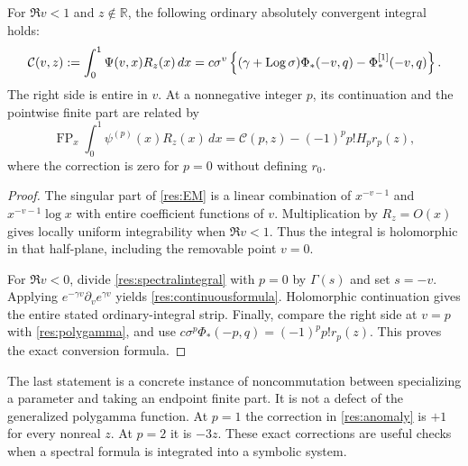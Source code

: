 \begin{theorem}
\label{res:continuous}
For $\Re v<1$ and $z\notin\mathbb R$, the following ordinary
absolutely convergent integral holds:
\begin{equation}\label{res:continuousformula}
 \mathcal C(v,z):=\int_0^1\Psi(v,x)R_z(x)\,dx
   =c\sigma^v\left\{(\gamma+\operatorname{Log}\sigma)\Phi_*(-v,q)
                                         -\Phi_*^{[1]}(-v,q)\right\}.
\end{equation}
The right side is entire in $v$. At a nonnegative integer $p$,
its continuation and the pointwise finite part are related by
\begin{equation}\label{res:anomaly}
 \operatorname{FP}_x\int_0^1\psi^{(p)}(x)R_z(x)\,dx
    =\mathcal C(p,z)-(-1)^pp!H_p r_p(z),
\end{equation}
where the correction is zero for $p=0$ without defining $r_0$.
\end{theorem}

\begin{proof}
The singular part of \eqref{res:EM} is a linear combination of
$x^{-v-1}$ and $x^{-v-1}\log x$ with entire coefficient functions
of $v$. Multiplication by $R_z=O(x)$ gives locally uniform
integrability when $\Re v<1$. Thus the integral is holomorphic
in that half-plane, including the removable point $v=0$.

For $\Re v<0$, divide \eqref{res:spectralintegral} with $p=0$
by $\Gamma(s)$ and set $s=-v$. Applying
$e^{-\gamma v}\partial_v e^{\gamma v}$ yields
\eqref{res:continuousformula}. Holomorphic continuation gives
the entire stated ordinary-integral strip. Finally, compare the
right side at $v=p$ with \eqref{res:polygamma}, and use
$c\sigma^p\Phi_*(-p,q)=(-1)^pp!r_p(z)$.
This proves the exact conversion formula.
\end{proof}

The last statement is a concrete instance of noncommutation between
specializing a parameter and taking an endpoint finite part. It is
not a defect of the generalized polygamma function. At $p=1$ the
correction in \eqref{res:anomaly} is $+1$ for every nonreal $z$.
At $p=2$ it is $-3z$. These exact corrections are useful checks
when a spectral formula is integrated into a symbolic system.

